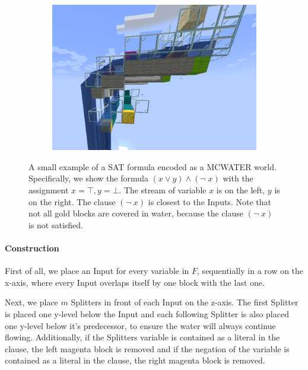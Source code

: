 \begin{figure}[h]
\begin{subfigure}{.33\textwidth}
\end{subfigure}
\begin{subfigure}{.33\textwidth}
  \centering
  \includegraphics[width=.9\linewidth]{images/small_example_side.png}
\end{subfigure}
\caption{A small example of a SAT formula encoded as a MCWATER world. Specifically, we show the formula $(x \vee y) \wedge (\neg \; x)$ with the assignment $x = \top, y = \bot$. The stream of variable $x$ is on the left, $y$ is on the right. The clause $(\neg \; x)$ is closest to the Inputs. Note that not all gold blocks are covered in water, because the clause $(\neg \; x)$ is not satisfied.}
\label{fig:small-example}
\end{figure}



\paragraph{Construction}
First of all, we place an Input for every variable in $F$, sequentially in a row on the x-axis, where every Input overlaps itself by one block with the last one.
\linebreak

Next, we place $m$ Splitters in front of each Input on the z-axis. The first Splitter is placed one y-level below the Input and each following Splitter is also placed one y-level below it's predecessor, to ensure the water will always continue flowing. Additionally, if the Splitters variable is contained  as a literal in the clause, the left magenta block is removed and if the negation of the variable is contained  as a literal in the clause, the right magenta block is removed.
\linebreak

